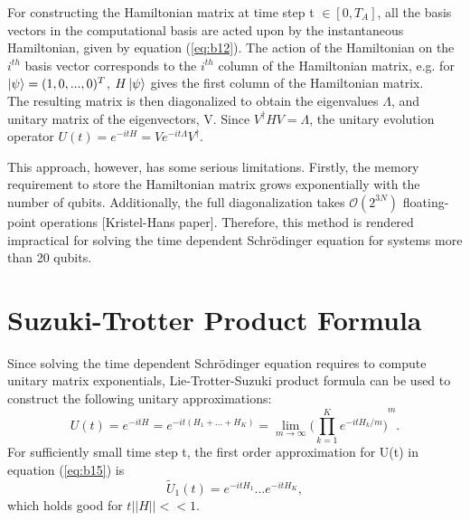 \documentclass[../main.tex]{subfiles}
\begin{document}
For constructing the Hamiltonian matrix at time step t $\in [0,T_A]$, all the basis vectors in the computational basis are acted upon by the instantaneous Hamiltonian, given by equation (\ref{eq:b12}). The action of the Hamiltonian on the $i^{th}$ basis vector corresponds to the $i^{th}$ column of the Hamiltonian matrix, e.g. for $\ket{\psi}=(1,0,...,0)^T$, $H\ket{\psi}$ gives the first column of the Hamiltonian matrix. \\
The resulting matrix is then diagonalized to obtain the eigenvalues $\Lambda$, and unitary matrix of the eigenvectors, V. Since $V^{\dagger}HV=\Lambda$, the unitary evolution operator $U(t)=e^{-itH}=Ve^{-it\Lambda}V^{\dagger}$.


This approach, however, has some serious limitations. Firstly, the memory requirement to store the Hamiltonian matrix grows exponentially with the number of qubits. Additionally, the full diagonalization takes $\mathcal{O}(2^{3N})$ floating-point operations [Kristel-Hans paper]. Therefore, this method is rendered impractical for solving the time dependent Schr{\"o}dinger equation for systems more than 20 qubits.

\section{Suzuki-Trotter Product Formula} 
Since solving the time dependent Schr{\"o}dinger equation requires to compute unitary matrix exponentials, Lie-Trotter-Suzuki product formula can be used to construct the following unitary approximations:
\begin{equation}
U(t)= e^{-itH}= e^{-it(H_1+...+H_K)}= \lim\limits_{m \to \infty} {\bigg(\prod_{k=1}^{K}e^{-itH_k/m} \bigg)}^m.    \label{eq:b15}
\end{equation}
For sufficiently small time step t, the first order approximation for U(t) in equation (\ref{eq:b15}) is
\begin{equation}
\tilde{U}_1(t)=e^{-itH_1}...e^{-itH_K},    \label{eq:b16}
\end{equation}
which holds good for $t \left| \left| H \right| \right| << 1$.
\end{document}
